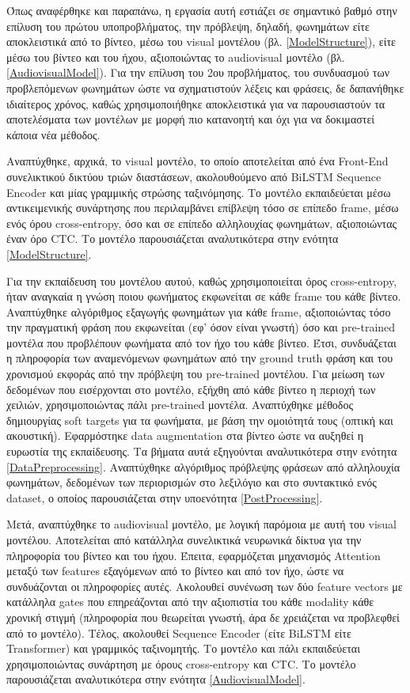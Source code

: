 Όπως αναφέρθηκε και παραπάνω, η εργασία αυτή εστιάζει σε σημαντικό βαθμό στην επίλυση του πρώτου υποπροβλήματος, την πρόβλεψη, δηλαδή, φωνημάτων είτε αποκλειστικά από το βίντεο, μέσω του visual μοντέλου (βλ. \ref{ModelStructure}), είτε μέσω του βίντεο και του ήχου, αξιοποιώντας το audiovisual μοντέλο (βλ. \ref{AudiovisualModel}). Για την επίλυση του 2ου προβλήματος, του συνδυασμού των προβλεπόμενων φωνημάτων ώστε να σχηματιστούν λέξεις και φράσεις, δε δαπανήθηκε ιδιαίτερος χρόνος, καθώς χρησιμοποιήθηκε αποκλειστικά για να παρουσιαστούν τα αποτελέσματα των μοντέλων με μορφή πιο κατανοητή και όχι για να δοκιμαστεί κάποια νέα μέθοδος.

Αναπτύχθηκε, αρχικά, το visual μοντέλο, το οποίο αποτελείται από ένα Front-End συνελικτικού δικτύου τριών διαστάσεων, ακολουθούμενο από BiLSTM Sequence Encoder και μίας γραμμικής στρώσης ταξινόμησης. Το μοντέλο εκπαιδεύεται μέσω αντικειμενικής συνάρτησης που περιλαμβάνει επίβλεψη τόσο σε επίπεδο frame, μέσω ενός όρου cross-entropy, όσο και σε επίπεδο αλληλουχίας φωνημάτων, αξιοποιώντας έναν όρο CTC. Το μοντέλο παρουσιάζεται αναλυτικότερα στην ενότητα \ref{ModelStructure}. 

Για την εκπαίδευση του μοντέλου αυτού, καθώς χρησιμοποιείται όρος cross-entropy, ήταν αναγκαία η γνώση ποιου φωνήματος εκφωνείται σε κάθε frame του κάθε βίντεο. Αναπτύχθηκε αλγόριθμος εξαγωγής φωνημάτων για κάθε frame, αξιοποιώντας τόσο την πραγματική φράση που εκφωνείται (εφ' όσον είναι γνωστή) όσο και pre-trained μοντέλα που προβλέπουν φωνήματα από τον ήχο του κάθε βίντεο. Έτσι, συνδυάζεται η πληροφορία των αναμενόμενων φωνημάτων από την ground truth φράση και του χρονισμού εκφοράς από την πρόβλεψη του pre-trained μοντέλου. Για μείωση των δεδομένων που εισέρχονται στο μοντέλο, εξήχθη από κάθε βίντεο η περιοχή των χειλιών, χρησιμοποιώντας πάλι pre-trained μοντέλα. Αναπτύχθηκε μέθοδος δημιουργίας soft targets για τα φωνήματα, με βάση την ομοιότητά τους (οπτική και ακουστική). Εφαρμόστηκε data augmentation στα βίντεο ώστε να αυξηθεί η ευρωστία της εκπαίδευσης. Τα βήματα αυτά εξηγούνται αναλυτικότερα στην ενότητα \ref{DataPreprocessing}. Αναπτύχθηκε αλγόριθμος πρόβλεψης φράσεων από αλληλουχία φωνημάτων, δεδομένων των περιορισμών στο λεξιλόγιο και στο συντακτικό ενός dataset, ο οποίος παρουσιάζεται στην υποενότητα \ref{PostProcessing}.

Μετά, αναπτύχθηκε το audiovisual μοντέλο, με λογική παρόμοια με αυτή του visual μοντέλου. Αποτελείται από κατάλληλα συνελικτικά νευρωνικά δίκτυα για την πληροφορία του βίντεο και του ήχου. Έπειτα, εφαρμόζεται μηχανισμός Attention μεταξύ των features εξαγόμενων από το βίντεο και από τον ήχο, ώστε να συνδυάζονται οι πληροφορίες αυτές. Ακολουθεί συνένωση των δύο feature vectors με κατάλληλα gates που επηρεάζονται από την αξιοπιστία του κάθε modality κάθε χρονική στιγμή (πληροφορία που θεωρείται γνωστή, άρα δε χρειάζεται να προβλεφθεί από το μοντέλο). Τέλος, ακολουθεί Sequence Encoder (είτε BiLSTM είτε Transformer) και γραμμικός ταξινομητής. Το μοντέλο και πάλι εκπαιδεύεται χρησιμοποιώντας συνάρτηση με όρους cross-entropy και CTC. Το μοντέλο παρουσιάζεται αναλυτικότερα στην ενότητα \ref{AudiovisualModel}. 

